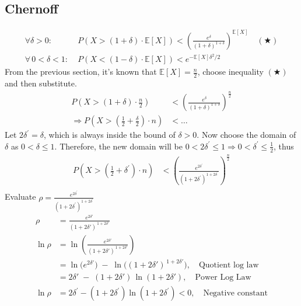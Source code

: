 \documentclass[a4paper, 12pt]{article}
\begin{document}
    \subsection{Chernoff}
        \begin{equation*}
            \begin{aligned}
                \forall \delta > 0:&\;
                P\!\left(X > (1+\delta)\cdot \mathbb{E}[X]\right)
                < \left( \frac{e^{\delta}}{(1+\delta)^{1+\delta}} \right)^{\mathbb{E}[X]}\quad(\bigstar)\\
                \forall\, 0 < \delta < 1:&\;
                P\!\left(X < (1-\delta)\cdot \mathbb{E}[X]\right)
                < e^{-\mathbb{E}[X]\delta^{2}/2}
            \end{aligned} 
        \end{equation*}
        From the previous section, it's known that $\mathbb{E}[X] = \frac{n}{2}$, choose inequality $(\bigstar)$  and then substitute.
        \begin{align*}
            P\left(X > (1 + \delta)\cdot\frac{n}{2}\right) &< \left(\frac{e^\delta}{(1+\delta)^{1+\delta}}\right)^{\frac{n}{2}}\\
            \Rightarrow P\left(X > \left(\frac{1}{2} + \frac{\delta}{2}\right)\cdot n\right) &< \ldots
        \end{align*}
        Let $2\delta^\prime = \delta$, which is always inside the bound of $\delta > 0$. Now choose the domain of $\delta$ as $0 < \delta \leq 1$. Therefore, the
        new domain will be $0<2\delta^\prime\leq1\Rightarrow0<\delta^\prime\leq\frac{1}{2}$, thus
        \begin{align*}
            P\left(X > \left(\frac{1}{2} + \delta^\prime\right)\cdot n\right) &< \left(\frac{e^{2\delta^\prime}}{(1+2\delta^\prime)^{1+2\delta^\prime}}\right)^{\frac{n}{2}}\\
        \end{align*}
        Evaluate $\rho = \frac{e^{2\delta^\prime}}{(1+2\delta^\prime)^{1+2\delta^\prime}}$
        \begin{align*}
            \rho
                &= \frac{e^{2\delta'}}{(1+2\delta')^{\,1+2\delta'}}\\[2mm]
                \ln \rho
                &= \ln\!\left(\frac{e^{2\delta'}}{(1+2\delta')^{\,1+2\delta'}}\right)\\
                &= \ln\!\big(e^{2\delta'}\big)\;-\;\ln\!\big((1+2\delta')^{\,1+2\delta'}\big),\quad\text{Quotient log law}\\
                &= 2\delta'\;-\;(1+2\delta')\,\ln(1+2\delta'),\quad\text{Power Log Law}\\
                \ln\rho &= 2\delta^\prime - (1+2\delta^\prime)\ln (1+2\delta^\prime) < 0,\quad\text{Negative constant}
        \end{align*}
\end{document}
